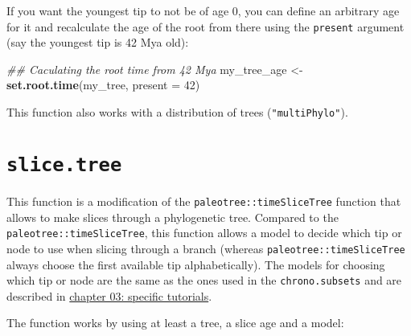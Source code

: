 \documentclass[
]{book}
\newenvironment{Shaded}{\begin{snugshade}}{\end{snugshade}}
\newcommand{\CommentTok}[1]{\textcolor[rgb]{0.56,0.35,0.01}{\textit{#1}}}
\newcommand{\DataTypeTok}[1]{\textcolor[rgb]{0.13,0.29,0.53}{#1}}
\newcommand{\DecValTok}[1]{\textcolor[rgb]{0.00,0.00,0.81}{#1}}
\newcommand{\KeywordTok}[1]{\textcolor[rgb]{0.13,0.29,0.53}{\textbf{#1}}}
\newcommand{\NormalTok}[1]{#1}
\newcommand{\StringTok}[1]{\textcolor[rgb]{0.31,0.60,0.02}{#1}}
\begin{document}
If you want the youngest tip to not be of age 0, you can define an arbitrary age for it and recalculate the age of the root from there using the \texttt{present} argument (say the youngest tip is 42 Mya old):

\begin{Shaded}
\begin{Highlighting}[]
\CommentTok{\#\# Caculating the root time from 42 Mya }
\NormalTok{my\_tree\_age \textless{}{-}}\StringTok{ }\KeywordTok{set.root.time}\NormalTok{(my\_tree, }\DataTypeTok{present =} \DecValTok{42}\NormalTok{)}
\end{Highlighting}
\end{Shaded}

This function also works with a distribution of trees (\texttt{"multiPhylo"}).

\hypertarget{slice.tree}{%
\section{\texorpdfstring{\texttt{slice.tree}}{slice.tree}}\label{slice.tree}}

This function is a modification of the \texttt{paleotree::timeSliceTree} function that allows to make slices through a phylogenetic tree.
Compared to the \texttt{paleotree::timeSliceTree}, this function allows a model to decide which tip or node to use when slicing through a branch (whereas \texttt{paleotree::timeSliceTree} always choose the first available tip alphabetically).
The models for choosing which tip or node are the same as the ones used in the \texttt{chrono.subsets} and are described in \protect\hyperlink{chrono-subsets}{chapter 03: specific tutorials}.

The function works by using at least a tree, a slice age and a model:
\end{document}
